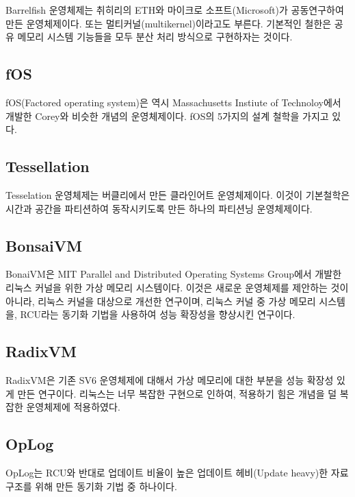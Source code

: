 Barrelfish 운영체제는 취히리의 ETH와 마이크로 소프트(Microsoft)가 공동연구하여 만든 운영체제이다. 
또는 멀티커널(multikernel)이라고도 부른다.
기본적인 철한은 공유 메모리 시스템 기능들을 모두 분산 처리 방식으로 구현하자는 것이다.


\subsection{fOS}

fOS(Factored operating system)은 역시 Massachusetts Instiute of Technoloy에서 개발한
Corey와 비슷한 개념의 운영체제이다. 
fOS의 5가지의 설계 철학을 가지고 있다. 

\subsection{Tessellation}

Tesselation 운영체제는 버클리에서 만든 클라인어트 운영체제이다.
이것이 기본철학은 시간과 공간을 파티션하여 동작시키도록 만든 하나의 파티션닝 운영체제이다.


\subsection{BonsaiVM}

BonaiVM은 MIT Parallel and Distributed Operating Systems Group에서 개발한 리눅스 커널을 위한 
가상 메모리 시스템이다. 
이것은 새로운 운영체제를 제안하는 것이 아니라, 리눅스 커널을 대상으로 개선한 연구이며, 
리눅스 커널 중 가상 메모리 시스템을, RCU라는 동기화 기법을 사용하여 성능 확장성을 향상시킨 연구이다.


\subsection{RadixVM}

RadixVM은 기존 SV6 운영체제에 대해서 가상 메모리에 대한 부분을 성능 확장성 있게 만든 연구이다.
리눅스는 너무 복잡한 구현으로 인하여, 적용하기 힘은 개념을 덜 복잡한 운영체제에 적용하였다. 

\subsection{OpLog}

OpLog는 RCU와 반대로 업데이트 비율이 높은 업데이트 헤비(Update heavy)한 자료구조를 위해 만든 
동기화 기법 중 하나이다.


